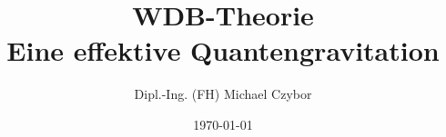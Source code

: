 \documentclass[11pt, a4paper, twoside, openright]{book}
\begin{document}
\frontmatter
\title{WDB-Theorie\\Eine effektive Quantengravitation}
\author{Dipl.-Ing. (FH) Michael Czybor}
\date{\today}
\maketitle

\tableofcontents

\mainmatter




\backmatter
\printbibliography[title=Literaturverzeichnis]
\printglossary[title=Glossar]
\printglossary[type=acronym, title=Abkürzungen]
\end{document}
